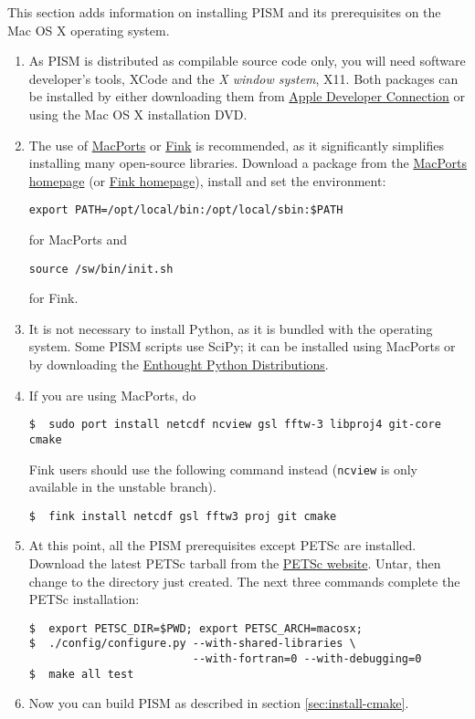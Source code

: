 \documentclass[titlepage,letterpaper,final]{scrartcl}
\begin{document}
This section adds information on installing PISM and its prerequisites on the Mac OS X operating system.

\begin{enumerate}
\item As PISM is distributed as compilable source code only, you will need
  software developer's tools, XCode and the \emph{X window system}, X11. Both
  packages can be installed by either downloading them from
  \href{http://developer.apple.com/tools/xcode/}{Apple Developer Connection} or
  using the Mac OS X installation DVD.
\item The use of \href{http://www.macports.org/}{MacPorts} or
  \href{http://www.finkproject.org/}{Fink} is recommended, as it significantly
  simplifies installing many open-source libraries. Download a package from the
  \href{http://www.macports.org/install.php}{MacPorts homepage} (or
  \href{http://www.finkproject.org/download/index.php}{Fink homepage}), install
  and set the environment:

\begin{verbatim}
export PATH=/opt/local/bin:/opt/local/sbin:$PATH
\end{verbatim}
for MacPorts and
\begin{verbatim}
source /sw/bin/init.sh
\end{verbatim}
for Fink.

\item It is not necessary to install Python, as it is bundled with
  the operating system. Some PISM scripts use SciPy; it can be installed using MacPorts or
  by downloading the \href{http://www.enthought.com/}{Enthought Python Distributions}.

\item  If you are using MacPorts, do
\begin{verbatim}
$  sudo port install netcdf ncview gsl fftw-3 libproj4 git-core cmake
\end{verbatim}

Fink users should use the following command instead (\texttt{ncview} is only available in the unstable branch).
\begin{verbatim}
$  fink install netcdf gsl fftw3 proj git cmake
\end{verbatim}

\item At this point, all the PISM prerequisites except PETSc are installed.
Download the latest PETSc tarball from the
  \href{http://www.mcs.anl.gov/petsc/petsc-as/}{PETSc website}.
Untar, then change to the directory just created.
The next three commands complete the PETSc installation:
\begin{verbatim}
$  export PETSC_DIR=$PWD; export PETSC_ARCH=macosx;
$  ./config/configure.py --with-shared-libraries \
                         --with-fortran=0 --with-debugging=0
$  make all test
\end{verbatim}

\item Now you can build PISM as described in section \ref{sec:install-cmake}.
\end{enumerate}
\end{document}
